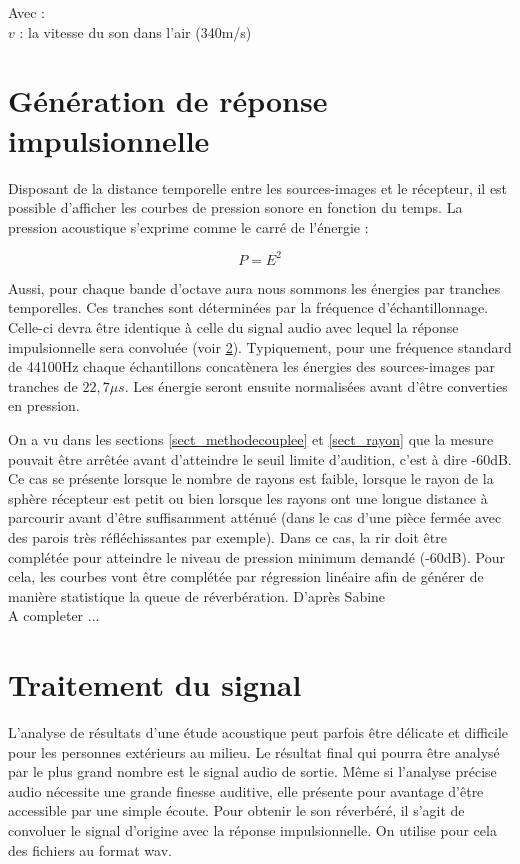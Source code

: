 Avec : \\
$v$ : la vitesse du son dans l'air (340m/s)

\section{Génération de réponse impulsionnelle} \label{sect_rir}

Disposant de la distance temporelle entre les sources-images et le récepteur, il est possible d'afficher les courbes de pression sonore en fonction du temps. La pression acoustique s'exprime comme le carré de l'énergie : 

\begin{equation}
P = E^2
\end{equation}

Aussi, pour chaque bande d'octave aura nous sommons les énergies par tranches temporelles. Ces tranches sont déterminées par la fréquence d'échantillonnage. Celle-ci devra être identique à celle du signal audio avec lequel la réponse impulsionnelle sera convoluée (voir \ref{sect_TDS}). Typiquement, pour une fréquence standard de 44100Hz chaque échantillons concatènera les énergies des sources-images par tranches de $22,7\mu s$. Les énergie seront ensuite normalisées avant d'être converties en pression. 

On a vu dans les sections \ref{sect_methodecouplee} et \ref{sect_rayon} que la mesure pouvait être arrêtée avant d'atteindre le seuil limite d'audition, c'est à dire -60dB. Ce cas se présente lorsque le nombre de rayons est faible, lorsque le rayon de la sphère récepteur est petit ou bien lorsque les rayons ont une longue distance à parcourir avant d'être suffisamment atténué (dans le cas d'une pièce fermée avec des parois très réfléchissantes par exemple). Dans ce cas, la \gls{rir} doit être complétée pour atteindre le niveau de pression minimum demandé (-60dB). Pour cela, les courbes vont être complétée par régression linéaire afin de générer de manière statistique la queue de réverbération. D'après Sabine \cite[]{sabine} \\
A completer ...


\section{Traitement du signal} \label{sect_TDS}

L'analyse de résultats d'une étude acoustique peut parfois être délicate et difficile pour les personnes extérieurs au milieu. Le résultat final qui pourra être analysé par le plus grand nombre est le signal audio de sortie. Même si l'analyse précise audio nécessite une grande finesse auditive, elle présente pour avantage d'être accessible par une simple écoute. Pour obtenir le son réverbéré, il s'agit de convoluer le signal d'origine avec la réponse impulsionnelle. On utilise pour cela des fichiers au format \gls{wav}. \\

